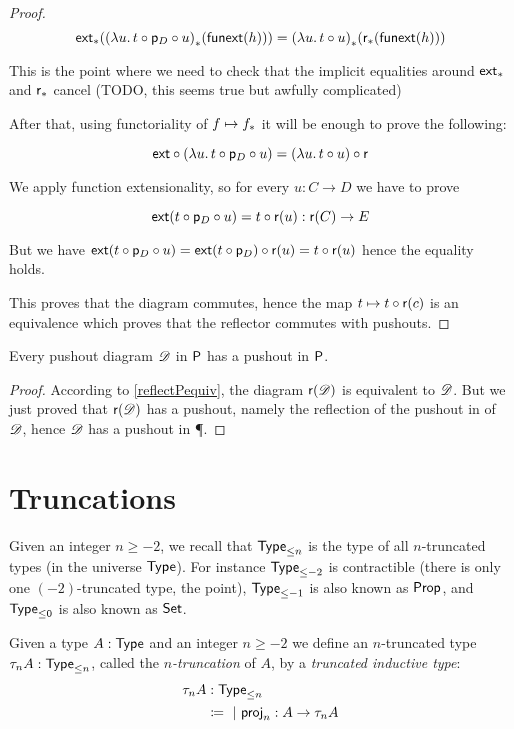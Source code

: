 \begin{proof}
  \[\map{\ext}{\map{(\lambda{}u.\,t\circ\project_D\circ{}u)}{\funext(h)}}=
  \map{(\lambda{}u.\,t\circ{}u)}{\map{\reflect}{\funext(h)}}\]

  This is the point where we need to check that the implicit equalities around
  $\mapfunc{\ext}$ and $\mapfunc{\reflect}$ cancel (TODO, this seems true but
  awfully complicated)

  After that, using functoriality of $f\mapsto\mapfunc{f}$ it will be enough to
  prove the following:

  \[\ext\circ(\lambda{}u.\,t\circ\project_D\circ{}u)=
  (\lambda{}u.\,t\circ{}u)\circ\reflect\]

  We apply function extensionality, so for every $u:C\to{}D$ we have to prove

  \[\ext(t\circ\project_D\circ{}u) = t\circ\reflect(u) : \reflect(C)\to E\]

  But we have
  $\ext(t\circ\project_D\circ{}u)=\ext(t\circ\project_D)\circ\reflect(u)=t\circ\reflect(u)$
  hence the equality holds.

  This proves that the diagram commutes, hence the map
  $t\mapsto{}\composecocone{t}\reflect(c)$ is an equivalence which proves that
  the reflector commutes with pushouts.
\end{proof}

\begin{cor}
  Every pushout diagram $\Ddiag$ in $\P$ has a pushout in $\P$.
\end{cor}

\begin{proof}
  According to \autoref{reflectPequiv}, the diagram $\reflect(\Ddiag)$ is
  equivalent to $\Ddiag$. But we just proved that $\reflect(\Ddiag)$ has a
  pushout, namely the reflection of the pushout in \type of $\Ddiag$, hence
  $\Ddiag$ has a pushout in \P.
\end{proof}

\section{Truncations}

Given an integer $n\ge-2$, we recall that $\typele{n}$ is the type of all
$n$-truncated types (in the universe $\type$). For instance $\typele{-2}$ is
contractible (there is only one $(-2)$-truncated type, the point), $\typele{-1}$
is also known as $\prop$, and $\typele{0}$ is also known as $\set$.

Given a type $A:\type$ and an integer $n\ge-2$ we define an $n$-truncated type
$\tau_nA:\typele{n}$, called the \emph{$n$-truncation} of $A$, by a
\emph{truncated inductive type}:
\begin{align*}
  \tau_nA&:\typele{n}\\
  &\coloneqq\ |\ \tproj_n:A\to\tau_nA
\end{align*}

